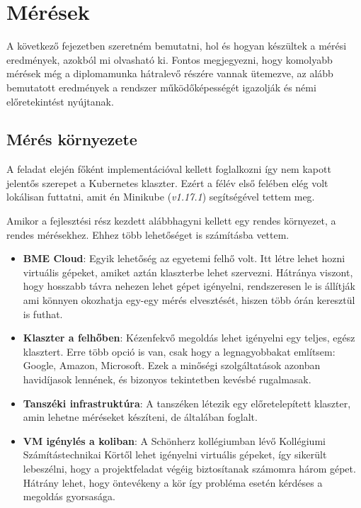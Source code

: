\chapter{Mérések}
\label{sec:results}

A következő fejezetben szeretném bemutatni, hol és hogyan készültek a mérési eredmények, azokból mi olvasható ki. Fontos megjegyezni, hogy komolyabb mérések még a diplomamunka hátralevő részére vannak ütemezve, az alább bemutatott eredmények a rendszer működőképességét igazolják és némi előretekintést nyújtanak.

\section{Mérés környezete}
A feladat elején főként implementációval kellett foglalkozni így nem kapott jelentős szerepet a Kubernetes klaszter. Ezért  a félév első felében elég volt lokálisan futtatni, amit én Minikube (\textit{v1.17.1}) segítségével tettem meg. 

Amikor a fejlesztési rész kezdett alábbhagyni kellett egy rendes környezet, a rendes mérésekhez. Ehhez több lehetőséget is számításba vettem.	

\begin{itemize}
  \item \textbf{BME Cloud}: Egyik lehetőség az egyetemi felhő volt. Itt létre lehet hozni virtuális gépeket, amiket aztán klaszterbe lehet szervezni. Hátránya viszont, hogy hosszabb távra nehezen lehet gépet igényelni, rendszeresen le is állítják ami könnyen okozhatja egy-egy mérés elvesztését, hiszen több órán keresztül is futhat.
  \item \textbf{Klaszter a felhőben}: Kézenfekvő megoldás lehet igényelni egy teljes, egész klasztert. Erre több opció is van, csak hogy a legnagyobbakat említsem: Google, Amazon, Microsoft. Ezek a minőségi szolgáltatások azonban havidíjasok lennének, és bizonyos tekintetben kevésbé rugalmasak.
    \item \textbf{Tanszéki infrastruktúra}: A tanszéken létezik egy előretelepített klaszter, amin lehetne méréseket készíteni, de általában foglalt.
      \item \textbf{VM igénylés a koliban}: A Schönherz kollégiumban lévő Kollégiumi Számítástechnikai Körtől lehet igényelni virtuális gépeket, így sikerült lebeszélni, hogy a projektfeladat végéig biztosítanak számomra három gépet. Hátrány lehet, hogy öntevékeny a kör így probléma esetén kérdéses a megoldás gyorsasága. 
\end{itemize}		


